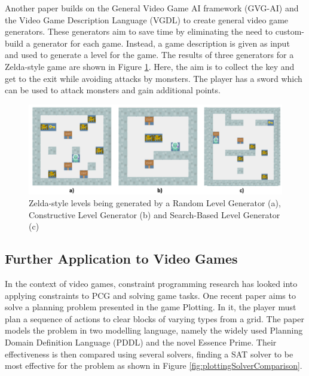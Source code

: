 Another paper \cite{GVG-AI_and_VGDL_Level_Generators} builds on the General Video Game AI framework (GVG-AI) and the Video Game Description Language (VGDL) to create general video game generators. These generators aim to save time by eliminating the need to custom-build a generator for each game. Instead, a game description is given as input and used to generate a level for the game. The results of three generators for a Zelda-style game are shown in Figure \ref{fig:gvgAILevels}. Here, the aim is to collect the key and get to the exit while avoiding attacks by monsters. The player has a sword which can be used to attack monsters and gain additional points.

\begin{figure}[H]
        \centering
        \includegraphics[width=\textwidth, height=0.3\textheight, keepaspectratio]{Images/GVGAILevels.png}
        \caption{Zelda-style levels being generated by a Random Level Generator (a), Constructive Level Generator (b) and Search-Based Level Generator (c) \cite{GVG-AI_and_VGDL_Level_Generators}}
        \label{fig:gvgAILevels}
\end{figure}

\subsection{Further Application to Video Games}
In the context of video games, constraint programming research has looked into applying constraints to PCG and solving game tasks. One recent paper \cite{Plotting_Planning_Problem} aims to solve a planning problem presented in the game Plotting. In it, the player must plan a sequence of actions to clear blocks of varying types from a grid. The paper models the problem in two modelling language, namely the widely used Planning Domain Definition Language (PDDL) and the novel Essence Prime. Their effectiveness is then compared using several solvers, finding a SAT solver to be most effective for the problem as shown in Figure \ref{fig:plottingSolverComparison}.

